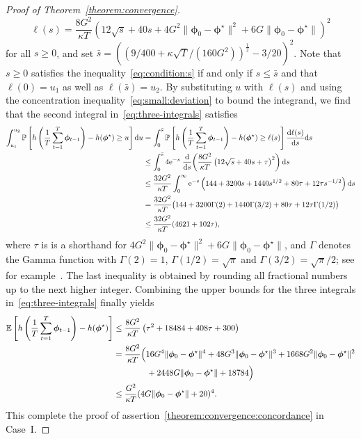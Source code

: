 \documentclass[11pt, a4paper, oneside, reqno]{article}
\begin{document}
\begin{proof} [Proof of Theorem~\ref{theorem:convergence}]
		$$ \ell(s) = \frac{8 G^2}{\kappa T} \left(12 \sqrt{s} + 40 s + 4 G^2 \| \bm \phi_0 - \bm \phi^\star \|^2 + 6 G \| \bm \phi_0 - \bm \phi^\star \|\right)^2 $$
		for all $s\ge 0$, and set $\bar s = ((9/400 + \kappa \sqrt{T} / (160 G^2))^{\frac{1}{2}} - 3 / 20)^{2}$. Note that $s\ge 0$ satisfies the inequality~\eqref{eq:condition:s} if and only if $s\le\bar s$ and that $\ell(0) = u_1$ as well as $\ell(\bar s) = u_2$. By substituting $u$ with $ \ell(s)$ and using the concentration inequality~\eqref{eq:small:deviation} to bound the integrand, we find that the second integral in~\eqref{eq:three-integrals} satisfies
		\begin{align*}
		    \int_{u_1}^{u_2} \mathbb P \left[ h \left(\frac{1}{T} \sum_{t=1}^{T} \bm \phi_{t-1} \right) - h(\bm \phi^\star) \geq u \right] \mathrm{d} u 
		    &= \int_{0}^{\bar s} \mathbb P \left[ h \left(\frac{1}{T} \sum_{t=1}^{T} \bm \phi_{t-1} \right) - h(\bm \phi^\star) \geq \ell(s) \right] \frac{\mathrm{d} \ell(s)}{\mathrm{d} s} \mathrm{d} s \\
		    &\leq \int_{0}^{\bar s} 4 \mathrm{e}^{-s} \; \frac{\mathrm{d}}{\mathrm{d} s} \! \left( \frac{8 G^2}{\kappa T} \left(12 \sqrt{s} + 40 s + \tau \right)^2 \right) \mathrm{d} s \\
		    &\leq \frac{32 G^2}{\kappa T} \int_{0}^{\infty} \mathrm{e}^{-s} \left( 144 + 3200 s + 1440 s^{1/2} + 80 \tau + 12 \tau s^{-1/2} \right) \mathrm{d} s \\
		    &= \frac{32 G^2}{\kappa T} \big( 144 + 3200 \Gamma(2) + 1440 \Gamma(3/2) + 80 \tau + 12 \tau \Gamma(1/2) \big) \\
		    &\leq \frac{32 G^2}{\kappa T} ( 4621 + 102 \tau ),
		\end{align*}
		where $\tau$ is is a shorthand for $4 G^2 \| \bm \phi_0 - \bm \phi^\star \|^2 + 6 G \| \bm \phi_0 - \bm \phi^\star \| $, and $\Gamma$ denotes the Gamma function with $\Gamma(2) = 1$, $\Gamma(1/2) = \sqrt{\pi}$ and $\Gamma(3/2) = \sqrt{\pi}/2$; see for example~\citep[Chapter~8]{rudin1964principles}. The last inequality is obtained by rounding all fractional numbers up to the next higher integer. Combining the upper bounds for the three integrals in~\eqref{eq:three-integrals} finally yields
		\begin{align*}
		    \mathbb{E} \left[ h \left(\frac{1}{T} \sum_{t=1}^{T} \bm \phi_{t-1} \right) - h(\bm \phi^\star) \right] 
		    &\leq \frac{8 G^2}{\kappa T} \left( \tau^2 + 18484 + 408 \tau + 300 \right) \\
		    &= \frac{8 G^2}{\kappa T} \Big( 16 G^4 \| \bm \phi_0 - \bm \phi^\star \|^4 + 48 G^3 \| \bm \phi_0 - \bm \phi^\star \|^3 + 1668 G^2 \| \bm \phi_0 - \bm \phi^\star \|^2 \\
		    &\hspace{4em} + 2448 G \| \bm \phi_0 - \bm \phi^\star \| + 18784 \Big) \\
		    &\leq \frac{G^2}{\kappa T} (4 G \| \bm \phi_0 - \bm \phi^\star \| + 20)^4.
		\end{align*}
		This complete the proof of assertion~\ref{theorem:convergence:concordance} in Case~I.
		

\end{proof}
\end{document}
